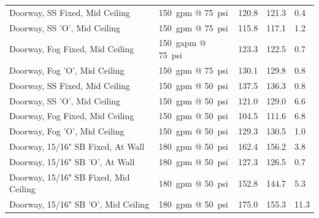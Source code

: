 \documentclass[12pt,oneside]{book}
\begin{document}
\begin{table}[!ht]
\begin{tabular}{lllll}
Doorway, SS Fixed, Mid Ceiling                   		 & 150~gpm @ 75~psi               & 120.8                             & 121.3                              & 0.4                    \\
Doorway, SS 'O', Mid Ceiling                     		 & 150~gpm @ 75~psi               & 115.8                             & 117.1                              & 1.2                    \\
Doorway, Fog Fixed, Mid Ceiling                  		 & 150~gapm @ 75~psi              & 123.3                             & 122.5                              & 0.7                    \\
Doorway, Fog 'O', Mid Ceiling                    		 & 150~gpm @ 75~psi               & 130.1                             & 129.8                              & 0.8                    \\
Doorway, SS Fixed, Mid Ceiling                   		 & 150~gpm @ 50~psi               & 137.5                             & 136.3                              & 0.8                    \\
Doorway, SS 'O', Mid Ceiling                     		 & 150~gpm @ 50~psi               & 121.0                             & 129.0                              & 6.6                    \\
Doorway, Fog Fixed, Mid Ceiling                  		 & 150~gpm @ 50~psi               & 104.5                             & 111.6                              & 6.8                    \\
Doorway, Fog 'O', Mid Ceiling                    		 & 150~gpm @ 50~psi               & 129.3                             & 130.5                              & 1.0                    \\
Doorway, 15/16" SB Fixed, At Wall                		 & 180~gpm @ 50~psi               & 162.4                             & 156.2                              & 3.8                    \\
Doorway, 15/16" SB 'O', At Wall                  		 & 180~gpm @ 50~psi               & 127.3                             & 126.5                              & 0.7                    \\
Doorway, 15/16" SB Fixed, Mid Ceiling            		 & 180~gpm @ 50~psi               & 152.8                             & 144.7                              & 5.3                    \\
Doorway, 15/16" SB 'O', Mid Ceiling              		 & 180~gpm @ 50~psi               & 175.0                             & 155.3                              & 11.3                   \\

\end{tabular}
\end{table}
\end{document}
